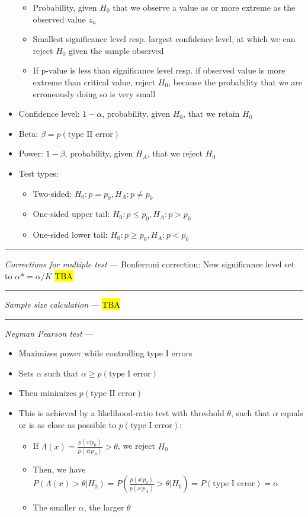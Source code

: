 \begin{itemize}
\begin{itemize}
        \item Probability, given $H_0$ that we observe a value as or more extreme as the observed value $z_n$ 
        \item Smallest significance level resp. largest confidence level, at which we can reject $H_0$ given the sample observed
        \item If p-value is less than significance level resp. if observed value is more extreme than critical value, reject $H_0$, because the probability that we are erroneously doing so is very small
    \end{itemize}
    \item Confidence level: $1-\alpha$, probability, given $H_0$, that we retain $H_0$
    \item Beta: $\beta = p(\textrm{type II error})$
    \item Power: $1-\beta$, probability, given $H_A$, that we reject $H_0$
    \item Test types:
    \begin{itemize}
        \item Two-sided: $H_0: p = p_0, H_A: p \neq p_0$
        \item One-sided upper tail: $H_0: p \leq p_0, H_A: p > p_0$
        \item One-sided lower tail: $H_0: p \geq p_0, H_A: p < p_0$
    \end{itemize}
\end{itemize}

{\color{lightgray}\hrule height 0.001mm}

\emph{Corrections for multiple test} ---
Bonferroni correction: New significance level set to $\alpha* = \alpha / K$
\hl{TBA}

{\color{lightgray}\hrule height 0.001mm}

\emph{Sample size calculation} --- \hl{TBA}

{\color{lightgray}\hrule height 0.001mm}

\emph{Neyman Pearson test} ---
\begin{itemize}
    \item Maximizes power while controlling type I errors
    \item Sets $\alpha$ such that $\alpha \geq p(\textrm{type I error})$

    \item Then minimizes $p(\textrm{type II error})$
    \item This is achieved by a likelihood-ratio test with threshold $\theta$, such that $\alpha$ equals or is as close as possible to $ p(\textrm{type I error})$: 
    \begin{itemize}
        \item If $\Lambda(x) = \frac{p(x|p_0)}{p(x|p_A)} > \theta$, we reject $H_0$
        \item Then, we have $P(\Lambda(x) > \theta | H_0) = P(\frac{p(x|p_0)}{p(x|p_A)} > \theta | H_0 ) = P(\textrm{type I error}) = \alpha$
        \item The smaller $\alpha$, the larger $\theta$
    \end{itemize}
\end{itemize}

